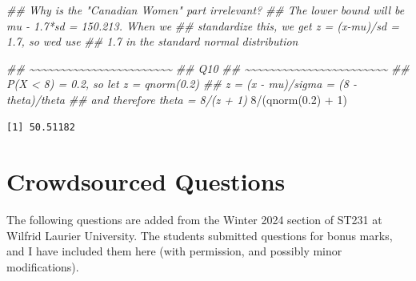 \documentclass[
  letterpaper,
  DIV=11,
  numbers=noendperiod,
  oneside]{scrreprt}
\newenvironment{Shaded}{\begin{snugshade}}{\end{snugshade}}
\newcommand{\DecValTok}[1]{\textcolor[rgb]{0.68,0.00,0.00}{#1}}
\newcommand{\DocumentationTok}[1]{\textcolor[rgb]{0.37,0.37,0.37}{\textit{#1}}}
\newcommand{\FloatTok}[1]{\textcolor[rgb]{0.68,0.00,0.00}{#1}}
\newcommand{\FunctionTok}[1]{\textcolor[rgb]{0.28,0.35,0.67}{#1}}
\newcommand{\NormalTok}[1]{\textcolor[rgb]{0.00,0.23,0.31}{#1}}
\newcommand{\SpecialCharTok}[1]{\textcolor[rgb]{0.37,0.37,0.37}{#1}}
\begin{document}
\begin{Shaded}
\begin{Highlighting}[]
\DocumentationTok{\#\# Why is the "Canadian Women" part irrelevant?}
\DocumentationTok{\#\# The lower bound will be mu {-} 1.7*sd = 150.213. When we}
\DocumentationTok{\#\# standardize this, we get z = (x{-}mu)/sd = 1.7, so we\textquotesingle{}d use}
\DocumentationTok{\#\# 1.7 in the standard normal distribution}

\DocumentationTok{\#\# \textasciitilde{}\textasciitilde{}\textasciitilde{}\textasciitilde{}\textasciitilde{}\textasciitilde{}\textasciitilde{}\textasciitilde{}\textasciitilde{}\textasciitilde{}\textasciitilde{}\textasciitilde{}\textasciitilde{}\textasciitilde{}\textasciitilde{}\textasciitilde{}\textasciitilde{}\textasciitilde{}\textasciitilde{}\textasciitilde{}\textasciitilde{}\textasciitilde{}\textasciitilde{}}
\DocumentationTok{\#\# Q10}
\DocumentationTok{\#\# \textasciitilde{}\textasciitilde{}\textasciitilde{}\textasciitilde{}\textasciitilde{}\textasciitilde{}\textasciitilde{}\textasciitilde{}\textasciitilde{}\textasciitilde{}\textasciitilde{}\textasciitilde{}\textasciitilde{}\textasciitilde{}\textasciitilde{}\textasciitilde{}\textasciitilde{}\textasciitilde{}\textasciitilde{}\textasciitilde{}\textasciitilde{}\textasciitilde{}\textasciitilde{}}
\DocumentationTok{\#\# P(X \textless{} 8) = 0.2, so let z = qnorm(0.2)}
\DocumentationTok{\#\# z = (x {-} mu)/sigma = (8 {-} theta)/theta}
\DocumentationTok{\#\# and therefore theta = 8/(z + 1)}
\DecValTok{8}\SpecialCharTok{/}\NormalTok{(}\FunctionTok{qnorm}\NormalTok{(}\FloatTok{0.2}\NormalTok{) }\SpecialCharTok{+} \DecValTok{1}\NormalTok{)}
\end{Highlighting}
\end{Shaded}

\begin{verbatim}
[1] 50.51182
\end{verbatim}

\hypertarget{crowdsourced-questions-4}{%
\section{Crowdsourced Questions}\label{crowdsourced-questions-4}}

The following questions are added from the Winter 2024 section of ST231
at Wilfrid Laurier University. The students submitted questions for
bonus marks, and I have included them here (with permission, and
possibly minor modifications).
\end{document}
